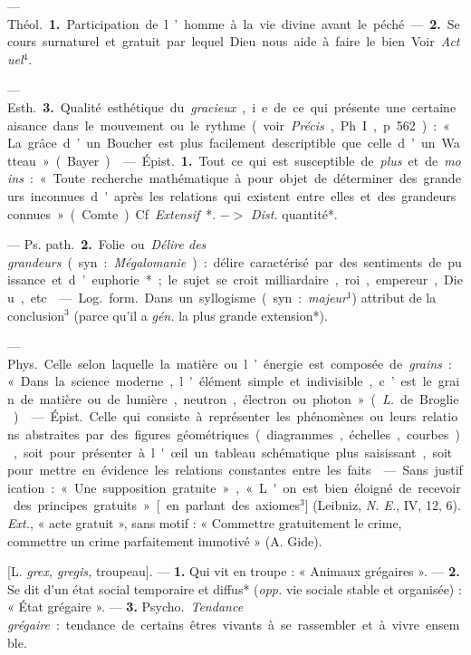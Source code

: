 \begin{itemize}[leftmargin=1cm, label=, itemsep=1pt]
 — \si{Théol.} {\bf 1.} Participation de l’homme à la vie divine
avant le péché. — {\bf 2.} Secours surnaturel et gratuit par lequel Dieu nous
aide à faire le bien. Voir {\it Actuel}$^4$.

— \si{Esth.} {\bf 3.} Qualité esthétique du {\it gracieux}, i. e. de ce qui
présente une certaine aisance dans le mouvement ou le rythme (voir
{\it Précis}, Ph. I, p 562) : « La grâce d’un Boucher est plus facilement
descriptible que celle d’un Watteau » (Bayer).

 — \si{Épist.} {\bf 1.} Tout ce qui est susceptible de
{\it plus} et de {\it moins} : « Toute recherche mathématique à pour objet de
déterminer des grandeurs inconnues d'après les relations qui existent entre
elles et des grandeurs connues » (Comte). Cf. {\it Extensif}*.
$->$ {\it Dist.} quantité*.

— \si{Ps. path.} {\bf 2.} Folie ou {\it Délire des grandeurs} (syn. :
{\it Mégalomanie}) : délire caractérisé par des sentiments de puissance et
d’euphorie* ; le sujet se croit milliardaire, roi, empereur, Dieu, etc.

 — \si{Log.} \si{form.} Dans un syllogisme (syn. :
{\it majeur}$^1$) attribut de la conclusion$^3$ (parce qu'il a {\it gén.}
la plus grande extension*).

 — \si{Phys.} Celle selon laquelle la matière ou
l’énergie est composée de {\it grains} : « Dans la science moderne,
l'élément simple et indivisible, c’est le grain de matière ou de lumière,
neutron, électron ou photon » ({\it L.} de Broglie).

 — \si{Épist.} Celle qui consiste à représenter les phénomènes ou leurs relations abstraites par des figures géométriques 
(diagrammes, échelles, courbes), soit pour présenter à l'œil un tableau
schématique plus saisissant, soit pour mettre en évidence les relations
constantes entre les faits.

 — Sans justification : « Une supposition gratuite », « L'on est
bien éloigné de recevoir des principes gratuits » [en parlant des axiomes$^3$]
(Leibniz, {\it N. E.}, IV, 12, 6). {\it Ext.}, « acte gratuit », sans motif :
« Commettre gratuitement le crime, commettre un crime parfaitement
immotivé » (A. Gide).

 [L. {\it grex, gregis,} troupeau]. — {\bf 1.} Qui vit en
troupe : « Animaux grégaires ». — {\bf 2.} Se dit d’un état social temporaire
et diffus* ({\it opp.} vie sociale stable et organisée) : « État grégaire ».
— {\bf 3.} \si{Psycho.} {\it Tendance grégaire} : tendance de certains êtres
vivants à se rassembler et à vivre ensemble.


\end{itemize}
